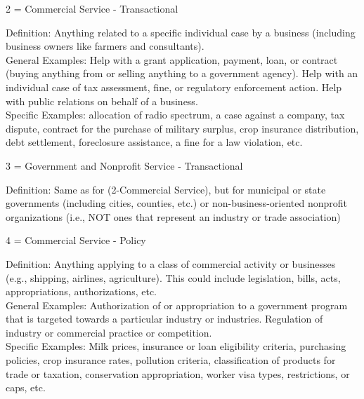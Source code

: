 \documentclass[12pt]{article}
\begin{document}
2 = Commercial Service - Transactional \\

\hfill\begin{minipage}{\dimexpr\textwidth-2cm}
Definition: Anything related to a specific individual case by a business (including business owners like farmers and consultants).\\ 
General Examples: Help with a grant application, payment, loan, or contract (buying anything from or selling anything to a government agency). Help with an individual case of tax assessment, fine, or regulatory enforcement action. Help with public relations on behalf of a business.\\
Specific Examples: allocation of radio spectrum, a case against a company, tax dispute, contract for the purchase of military surplus, crop insurance distribution, debt settlement, foreclosure assistance, a fine for a law violation, etc. \\
\end{minipage}

3 = Government and Nonprofit Service - Transactional\\

\hfill\begin{minipage}{\dimexpr\textwidth-2cm}
Definition: Same as for (2-Commercial Service), but for municipal or state governments (including cities, counties, etc.) or non-business-oriented nonprofit organizations (i.e., NOT ones that represent an industry or trade association) \\
\end{minipage}

4 = Commercial Service - Policy \\

\hfill\begin{minipage}{\dimexpr\textwidth-2cm}
Definition: Anything applying to a class of commercial activity or businesses (e.g., shipping, airlines, agriculture). This could include legislation, bills, acts, appropriations, authorizations, etc. \\
General Examples: Authorization of or appropriation to a government program that is targeted towards a particular industry or industries. Regulation of industry or commercial practice or competition.\\
Specific Examples: Milk prices, insurance or loan eligibility criteria, purchasing policies, crop insurance rates, pollution criteria, classification of products for trade or taxation, conservation appropriation, worker visa types, restrictions, or caps, etc.\\
\end{minipage}
 
\end{document}
